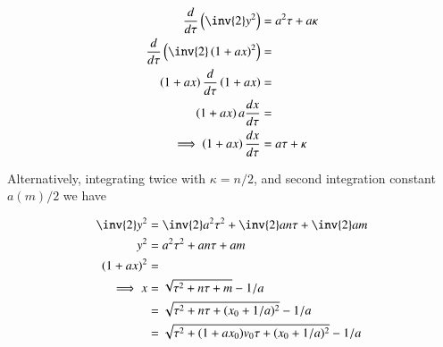 \begin{align*}
\frac{d}{d\tau}\left(\inv{2} y^2\right) &= a^2 \tau + a \kappa \\
\frac{d}{d\tau}\left(\inv{2} \left(1+ax\right)^2\right) &=  \\
\left(1+ax\right)\frac{d}{d\tau}\left(1+ax\right) &=  \\
\left(1+ax\right)a\frac{dx}{d\tau} &=  \\
\implies
\left(1+ax\right)\frac{dx}{d\tau} &= a\tau + \kappa \\
\end{align*}

Alternatively, integrating twice with $\kappa = n/2$, and second integration constant $a (m)/2$ we have

\begin{align*}
\inv{2} y^2 &= \inv{2} a^2 \tau^2 + \inv{2} a n \tau + \inv{2} a m \\
y^2 &= a^2 \tau^2 + a n\tau + a m \\
(1+ax)^2 &= \\
\implies
x
&= \sqrt{\tau^2 + n\tau + m} -1/a \\
&= \sqrt{\tau^2 + n\tau + (x_0 + 1/a)^2} -1/a \\
&= \sqrt{\tau^2 + (1 + a x_0)v_0 \tau + (x_0 + 1/a)^2} -1/a \\
\end{align*}



